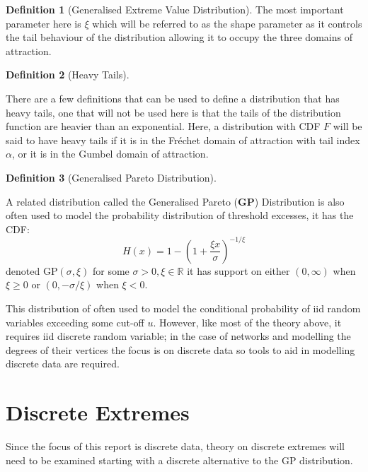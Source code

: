 \documentclass[
  10pt,
  a4paper,
]{scrreprt}
\theoremstyle{definition}
\newtheorem{definition}{Definition}[section]
\theoremstyle{remark}
\begin{document}
{\begin{definition}[Generalised Extreme Value
Distribution]
The most important parameter here is \(\xi\) which will be referred to
as the shape parameter as it controls the tail behaviour of the
distribution allowing it to occupy the three domains of attraction.

\end{definition}

\begin{definition}[Heavy
Tails]\protect\hypertarget{def-heavy}{}\label{def-heavy}

There are a few definitions that can be used to define a distribution
that has heavy tails, one that will not be used here is that the tails
of the distribution function are heavier than an exponential. Here, a
distribution with CDF \(F\) will be said to have heavy tails if it is in
the Fréchet domain of attraction with tail index \(\alpha\), or it is in
the Gumbel domain of attraction.

\end{definition}

\begin{definition}[Generalised Pareto
Distribution]\protect\hypertarget{def-gp}{}\label{def-gp}

A related distribution called the Generalised Pareto (\textbf{GP})
Distribution is also often used to model the probability distribution of
threshold excesses, it has the CDF: \[
H(x) = 1-\left(1+\frac{\xi x}{\sigma}\right)^{-1/\xi}
\] denoted \(\text{GP}(\sigma,\xi)\) for some
\(\sigma>0, \xi\in \mathbb R\) it has support on either \((0,\infty)\)
when \(\xi \ge 0\) or \((0,-\sigma/\xi)\) when \(\xi<0\).

\end{definition}

This distribution of often used to model the conditional probability of
iid random variables exceeding some cut-off \(u\). However, like most of
the theory above, it requires iid discrete random variable; in the case
of networks and modelling the degrees of their vertices the focus is on
discrete data so tools to aid in modelling discrete data are required.

\hypertarget{discrete-extremes}{%
\section{Discrete Extremes}\label{discrete-extremes}}

Since the focus of this report is discrete data, theory on discrete
extremes will need to be examined starting with a discrete alternative
to the GP distribution.

}
\end{document}

